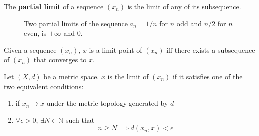   \begin{definition}
    The \textbf{partial limit} of a sequence $(x_n)$ is the limit of any of its subsequence.  

    \begin{figure}[H]
      \centering 
      \caption{Two partial limits of the sequence $a_n = 1/n$ for $n$ odd and $n/2$ for $n$ even, is $+\infty$ and $0$. } 
      \label{fig:partial_limit}
    \end{figure}
  \end{definition}

  \begin{lemma}
    Given a sequence $(x_n)$, $x$ is a limit point of $(x_n)$ iff there exists a subsequence of $(x_n)$ that converges to $x$. 
  \end{lemma}

  \begin{theorem}
    Let $(X, d)$ be a metric space. $x$ is the limit of $(x_n)$ if it satisfies one of the two equivalent conditions: 
    \begin{enumerate}
      \item if $x_n \to x$ under the metric topology generated by $d$
      \item $\forall \epsilon > 0$, $\exists N \in \mathbb{N}$ such that
      \begin{equation}
        n \geq N \implies d(x_n, x) < \epsilon 
      \end{equation}
    \end{enumerate}
  \end{theorem}
	
